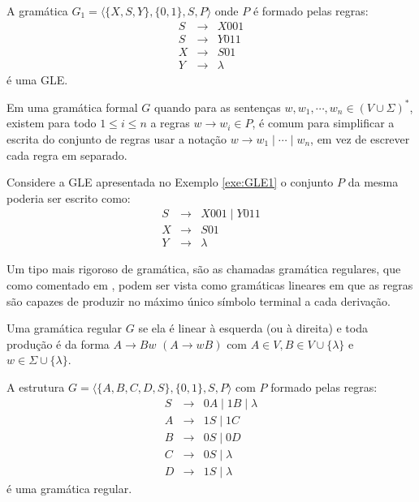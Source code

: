 \begin{exemplo}\label{exe:GLE1}
	A gramática $G_1 = \langle \{X, S , Y\}, \{0, 1\}, S, P \rangle$ onde $P$ é formado pelas regras:
	\begin{eqnarray*}
		S & \rightarrow& X001\\
		S & \rightarrow& Y011\\
		X & \rightarrow& S01\\
		Y & \rightarrow& \lambda
	\end{eqnarray*}
	é uma GLE.
\end{exemplo}

Em uma gramática formal $G$ quando para as sentenças $w, w_1, \cdots, w_n \in (V \cup \Sigma)^*$, existem para todo $1 \leq i \leq n$ a regras $w \rightarrow w_i \in P$, é comum para simplificar a escrita do conjunto de regras usar a notação $w \rightarrow w_1 \mid \cdots \mid w_n$, em vez de escrever cada regra em separado. 

\begin{exemplo}\label{exe:GLE}
	Considere a GLE apresentada no Exemplo \ref{exe:GLE1} o conjunto $P$ da mesma poderia ser escrito como:
	\begin{eqnarray*}
		S & \rightarrow& X001 \mid Y011\\
		X & \rightarrow& S01\\
		Y & \rightarrow& \lambda
	\end{eqnarray*}
\end{exemplo}


Um tipo mais rigoroso de gramática, são as chamadas gramática regulares, que como comentado em \cite{linz2006},  podem ser vista como gramáticas lineares em que as regras são capazes de produzir no máximo único símbolo terminal a cada derivação.

\begin{definicao}
	Uma gramática regular $G$ se ela é linear à esquerda (ou à direita) e toda produção é da forma $A \rightarrow Bw$ $(A \rightarrow wB)$ com $A \in V, B \in V \cup \{\lambda\}$ e $w \in \Sigma \cup \{\lambda\}$.
\end{definicao}

\begin{exemplo}\label{exe:Regular1}
  A estrutura $G = \langle \{A, B, C, D, S\}, \{0, 1\}, S, P \rangle$ com $P$ formado pelas regras:
  \begin{eqnarray*}
		S & \rightarrow& 0A \mid 1B \mid \lambda \\
		A & \rightarrow& 1S \mid 1C\\
		B & \rightarrow& 0S \mid 0D\\
		C & \rightarrow& 0S \mid \lambda\\
		D & \rightarrow& 1S \mid \lambda
	\end{eqnarray*}
  é uma gramática regular.
\end{exemplo}

